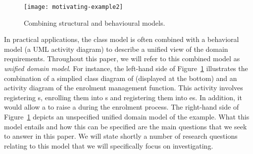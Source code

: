 \begin{figure}[th]
	\begin{center}
		\texttt{[image: motivating-example2]}
	\end{center}
	\caption{Combining structural and behavioural \courseman models.}
	\label{fig:motivatingExample2}
\end{figure}

In practical applications, the class model is often combined with a behavioral model (\eg a UML activity diagram) to describe a unified view of the domain requirements. Throughout this paper, we will refer to this combined model as \textit{unified domain model}. For instance, the left-hand side of Figure~\ref{fig:motivatingExample2} illustrates the combination of a simplied class diagram of \courseman (displayed at the bottom) and an activity diagram of the enrolment management function. This activity involves registering s, enrolling them into s and registering them into es. In addition, it would allow a  to raise a  during the enrolment process. 
The right-hand side of Figure~\ref{fig:motivatingExample2} depicts an unspecified unified domain model of the \courseman example. What this model entails and how this can be specified are the main questions that we seek to answer in this paper. We will state shortly a number of research questions relating to this model that we will specifically focus on investigating.




